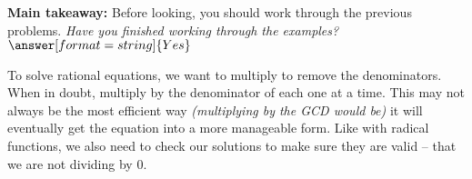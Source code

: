 \documentclass{ximera}
\begin{document}
\begin{question}
\textbf{Main takeaway:} Before looking, you should work through the previous problems. \textit{Have you finished working through the examples?} $\answer[format=string]{Yes}$
\begin{feedback}[correct]
To solve rational equations, we want to multiply to remove the denominators. When in doubt, multiply by the denominator of each one at a time. This may not always be the most efficient way \textit{(multiplying by the GCD would be)} it will eventually get the equation into a more manageable form. Like with radical functions, we also need to check our solutions to make sure they are valid -- that we are not dividing by 0.
\end{feedback}
\end{question}
\end{document}
